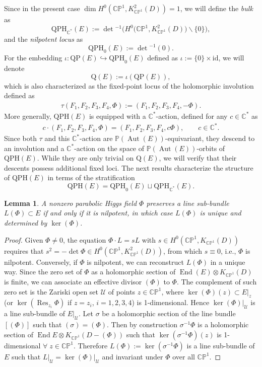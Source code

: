 \documentclass[pdftex]{sigma}
\newcommand{\field}[1]{\ensuremath{\mathbb{#1}}}
\newcommand{\CC}{\field{C}}
\newcommand{\PP}{\field{P}}
\newcommand{\curly}[1]{\mathscr{#1}}
\newcommand{\cU}{\curly{U}}
\DeclareMathOperator{\Aut}{Aut}
\DeclareMathOperator{\End}{End}
\DeclareMathOperator{\Res}{Res}
\numberwithin{equation}{section}
\newtheorem{Lemma}[Theorem]{Lemma}
\begin{document}
Since in the present case $\dim H^{0}(\CC\PP^{1},K^{2}_{\CC\PP^{1}}(D)) =1$, we will define the \textit{bulk} as
\[
\mathrm{QPH}_{\CC^{*}}(E) := \det{}^{-1}\bigl(H^{0}\big(\CC\PP^{1},K^{2}_{\CC\PP^{1}}(D)\big)\backslash\{0\}\bigr),
\]
and the \emph{nilpotent locus} as
\[
\mathrm{QPH}_{0}(E):=\det{}^{-1}(0).
\]
For the embedding $\iota \colon \mathrm{QP}(E)\hookrightarrow \mathrm{QPH}_{0}(E)$ defined as $\iota:= \{0\}\times\textrm{id}$, we will denote
\[
\mathrm{Q}(E) := \iota(\mathrm{QP}(E)),
\]
which is also characterized as the fixed-point locus of the holomorphic involution defined as
\begin{gather}\label{eq:def-tau}
\tau(F_{1},F_{2},F_{3},F_{4},\Phi):= (F_{1},F_{2},F_{3},F_{4},-\Phi).
\end{gather}
More generally, $\mathrm{QPH}(E)$ is equipped with a $\CC^{*}$-action,
defined for any $c\in\CC^{*}$ as
\begin{gather}\label{eq:def-C*}
c\cdot (F_{1},F_{2},F_{3},F_{4},\Phi) = (F_{1},F_{2},F_{3},F_{4},c\Phi),\qquad c\in\CC^{*}.
\end{gather}
Since both $\tau$ and this $\CC^{*}$-action are $\PP(\Aut(E))$-equivariant, they descend to an involution and a $\CC^{*}$-action on the space of $\PP(\Aut(E))$-orbits of $\mathrm{QPH}(E)$. While they are only trivial on $\mathrm{Q}(E)$, we will verify that their descents
possess additional fixed loci.
The next results characterize the structure of $\mathrm{QPH}(E)$ in terms of the stratification
\[
\mathrm{QPH}(E) = \mathrm{QPH}_{0}(E)\sqcup \mathrm{QPH}_{\CC^{*}}(E).
\]

\begin{Lemma}\label{lemma:nilpotent}
A nonzero parabolic Higgs field $\Phi$ preserves a line sub-bundle $L(\Phi)\subset E$ if and only if it is nilpotent, in which case $L(\Phi)$ is unique and determined by $\ker(\Phi)$.
\end{Lemma}

\begin{proof}
Given $\Phi\neq 0$, the equation $\Phi\cdot L = s L$ with $s\in H^{0}(\CC\PP^{1},K_{\CC\PP^{1}}(D))$ requires that $s^{2} = -\det \Phi\in H^{0}(\CC\PP^{1},K^{2}_{\CC\PP^{1}}(D))$, from which $s\equiv 0$, i.e., $\Phi$ is nilpotent. Conversely, if $\Phi$ is nilpotent, we can reconstruct $L(\Phi)$ in a unique way. Since the zero set of $\Phi$ as a holomorphic section of $\End(E)\otimes K_{\CC\PP^{1}}(D)$ is finite, we can associate an effective divisor $(\Phi)$ to $\Phi$. The complement of such zero set is the Zariski open set $\cU$ of points $z\in\CC\PP^{1}$, where $\ker(\Phi)(z)\subset E\vert_{z}$ (or $\ker(\Res_{z_{i}}\Phi)$ if $z=z_{i}$, $i=1,2,3,4$) is 1-dimensional. Hence $\ker(\Phi)\vert_{\cU}$ is a line sub-bundle of $E\vert_{\cU}$. Let $\sigma$ be a holomorphic section of the line bundle $[(\Phi)]$ such that $(\sigma)=(\Phi)$. Then by construction $\sigma^{-1}\Phi$ is a holomorphic section of $\End E\otimes K_{\CC\PP^{1}}(D-(\Phi))$ such that $\ker(\sigma^{-1}\Phi)(z)$ is 1-dimensional $\forall\; z\in\CC\PP^{1}$. Therefore $L(\Phi):=\ker(\sigma^{-1}\Phi)$ is a line sub-bundle of $E$ such that $L\vert_{\cU} =\ker(\Phi)\vert_{\cU}$ and invariant under $\Phi$ over all $\CC\PP^{1}$.
\end{proof}
\end{document}
